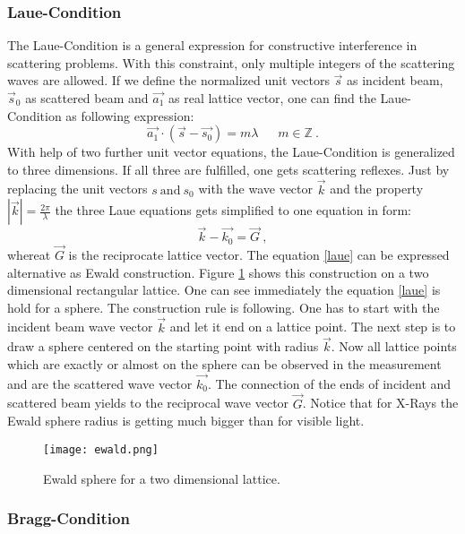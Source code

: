 	\subsubsection{Laue-Condition}
	The Laue-Condition is a general expression for constructive interference in scattering problems. With this constraint, only multiple integers of the scattering waves are allowed. If we define the normalized unit vectors $\vec s$ as incident beam, $\vec s_0$ as scattered beam and $\vec {a_1}$ as real lattice vector, one can find the Laue-Condition as following expression:
	\begin{equation}
		\vec{a_1} \cdot (\vec s - \vec{s_0})=m \lambda ~~~~~~~ m\in \mathbb{Z}~\mathrm{.}
	\end{equation}
	With help of two further unit vector equations, the Laue-Condition is generalized to three dimensions. If all three are fulfilled, one gets scattering reflexes. Just by replacing the unit vectors $s~\mathrm{and}~s_0$ with the wave vector $\vec k$ and the property $|\vec k|=\frac{2\pi}{\lambda}$ the three Laue equations gets simplified to one equation in form:
	\begin{equation}
		\vec k - \vec {k_0}=\vec G ~\mathrm{,}
		\label{laue}
	\end{equation}
	whereat $\vec G$ is the reciprocate lattice vector. The equation \ref{laue} can be expressed alternative as Ewald construction. Figure \ref{fig:ewald} shows this construction on a two dimensional rectangular lattice. One can see immediately the equation \eqref{laue} is hold for a sphere. The construction rule is following. One has to start with the incident beam wave vector $\vec k$ and let it end on a lattice point. The next step is to draw a sphere centered on the starting point with radius $\vec{k}$. Now all lattice points which are exactly or almost on the sphere can be observed in the measurement and are the scattered wave vector $\vec {k_0}$. The connection of the ends of incident and scattered beam yields to the reciprocal wave vector $\vec G$. Notice that for X-Rays the Ewald sphere radius is getting much bigger than for visible light.
	\begin{figure}[h]
		\centering
		\texttt{[image: ewald.png]}
		\caption[Ewald sphere for a two dimensional lattice]{Ewald sphere for a two dimensional lattice. \cite{Kop}}
		\label{fig:ewald}
	\end{figure}
	
	\subsubsection{Bragg-Condition}
	

